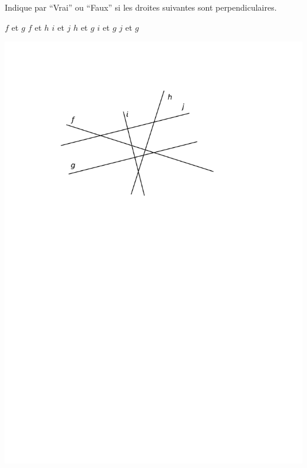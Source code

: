 \documentclass[a4paper,11pt]{report}
\begin{document}
\begin{exop}
    {Indique par ``Vrai'' ou ``Faux'' si les droites suivantes sont perpendiculaires. 

	    \begin{minipage}[t]{0.4\textwidth}{
	    \vspace{0pt}
	    \begin{tasks}
	\task $f$ et $g$  
    \task $f$ et $h$  
    \task $i$ et $j$  
    \task $h$ et $g$  
    \task $i$ et $g$  
    \task $j$ et $g$  
\end{tasks}
	    }
	    \end{minipage}
	    \hfill
	    \begin{minipage}[t]{0.6\textwidth}{
	    \vspace{0pt}
\begin{center}
	\includegraphics[scale=0.8]{media/es-11/13-5}
\end{center}
	    }
	    \end{minipage}

}
\end{exop}
\end{document}
